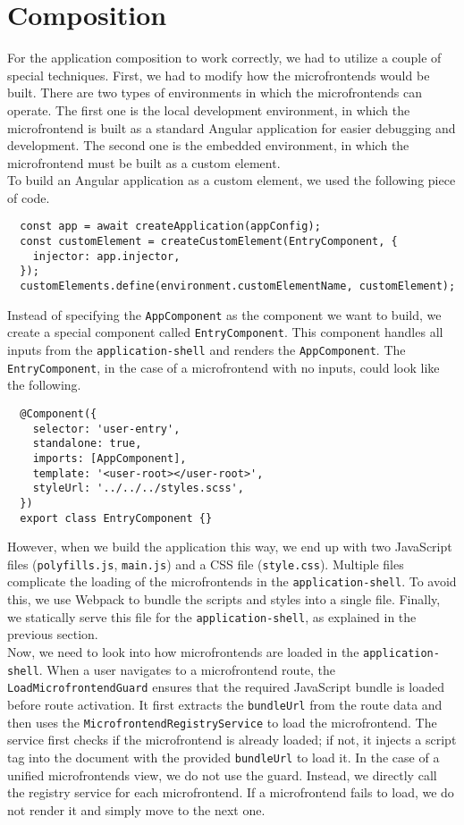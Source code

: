 \section{Composition}
For the application composition to work correctly, we had to utilize a couple of special techniques. First, we had to modify how the microfrontends would be built. There are two types of environments in which the microfrontends can operate. The first one is the local development environment, in which the microfrontend is built as a standard Angular application for easier debugging and development. The second one is the embedded environment, in which the microfrontend must be built as a custom element. \\

\noindent
To build an Angular application as a custom element, we used the following piece of code.
\begin{verbatim}
  const app = await createApplication(appConfig);
  const customElement = createCustomElement(EntryComponent, {
    injector: app.injector,
  });
  customElements.define(environment.customElementName, customElement);
\end{verbatim}
Instead of specifying the \texttt{AppComponent} as the component we want to build, we create a special component called \texttt{EntryComponent}. This component handles all inputs from the \texttt{application-shell} and renders the \texttt{AppComponent}. The \texttt{EntryComponent}, in the case of a microfrontend with no inputs, could look like the following.
\begin{verbatim}
  @Component({
    selector: 'user-entry',
    standalone: true,
    imports: [AppComponent],
    template: '<user-root></user-root>',
    styleUrl: '../../../styles.scss',
  })
  export class EntryComponent {}
\end{verbatim}
However, when we build the application this way, we end up with two JavaScript files (\texttt{polyfills.js}, \texttt{main.js}) and a CSS file (\texttt{style.css}). Multiple files complicate the loading of the microfrontends in the \texttt{application-shell}. To avoid this, we use Webpack to bundle the scripts and styles into a single file. Finally, we statically serve this file for the \texttt{application-shell}, as explained in the previous section. \\

\noindent
Now, we need to look into how microfrontends are loaded in the \texttt{application-shell}. When a user navigates to a microfrontend route, the \texttt{LoadMicrofrontendGuard} ensures that the required JavaScript bundle is loaded before route activation. It first extracts the \texttt{bundleUrl} from the route data and then uses the \texttt{MicrofrontendRegistryService} to load the microfrontend. The service first checks if the microfrontend is already loaded; if not, it injects a script tag into the document with the provided \texttt{bundleUrl} to load it. In the case of a unified microfrontends view, we do not use the guard. Instead, we directly call the registry service for each microfrontend. If a microfrontend fails to load, we do not render it and simply move to the next one.
